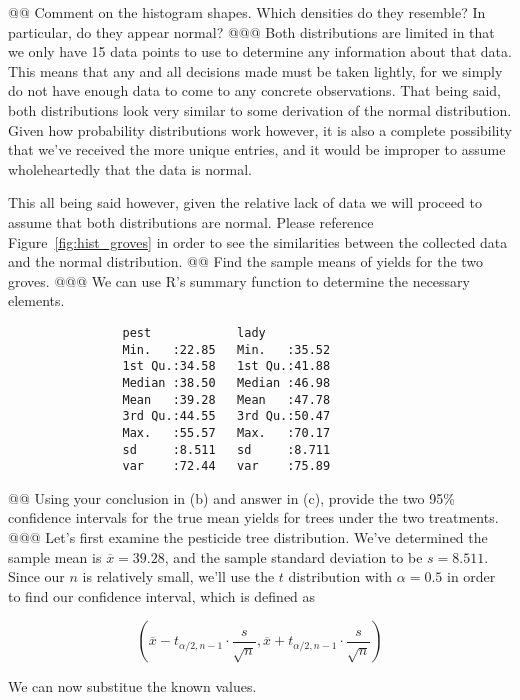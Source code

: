\documentclass[10pt]{article}
\begin{document}
\begin{easylist}[enumerate]
    @@ Comment on the histogram shapes. Which densities do they resemble? In particular, do they appear normal?
    @@@ Both distributions are limited in that we only have 15 data points to use to determine any information about
    that data. This means that any and all decisions made must be taken lightly, for we simply do not have enough data
    to come to any concrete observations. That being said, both distributions look very similar to some derivation of
    the normal distribution. Given how probability distributions work however, it is also a complete possibility that
    we've received the more unique entries, and it would be improper to assume wholeheartedly that the data is
    normal.\newline

    This all being said however, given the relative lack of data we will proceed to assume that both distributions are
    normal. Please reference Figure~\ref{fig:hist_groves} in order to see the similarities between the collected data
    and the normal distribution.
    @@ Find the sample means of yields for the two groves.
    @@@ We can use {\ttfamily R}'s summary function to determine the necessary elements.

        \begin{verbatim}
                pest            lady
                Min.   :22.85   Min.   :35.52
                1st Qu.:34.58   1st Qu.:41.88
                Median :38.50   Median :46.98
                Mean   :39.28   Mean   :47.78
                3rd Qu.:44.55   3rd Qu.:50.47
                Max.   :55.57   Max.   :70.17
                sd     :8.511   sd     :8.711
                var    :72.44   var    :75.89
        \end{verbatim}

    @@ Using your conclusion in (b) and answer in (c), provide the two 95\% confidence intervals for the true mean
    yields for trees under the two treatments.
    @@@ Let's first examine the pesticide tree distribution. We've determined the sample mean is $\overline{x} = 39.28$,
    and the sample standard deviation to be $s = 8.511$. Since our $n$ is relatively small, we'll use the $t$
    distribution with $\alpha = 0.5$ in order to find our confidence interval, which is defined as

    \[
        \left( \overline{x} - t_{\alpha/2,n-1} \cdot \frac{s}{\sqrt{n} },
        \overline{x} + t_{\alpha/2,n-1} \cdot \frac{s}{\sqrt{n} } \right)
    \]

    We can now substitue the known values.


\end{easylist}
\end{document}
